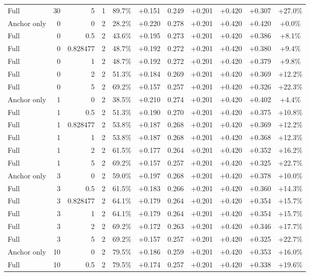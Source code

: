 \begin{table}[htbp]
\begin{tabular}{lrrrccccccc}
Full & 30 & 5 & 1 & 89.7\% & +0.151 & 0.249 & +0.201 & +0.420 & +0.307 & +27.0\% \\
Anchor only & 0 & 0 & 2 & 28.2\% & +0.220 & 0.278 & +0.201 & +0.420 & +0.420 & +0.0\% \\
Full & 0 & 0.5 & 2 & 43.6\% & +0.195 & 0.273 & +0.201 & +0.420 & +0.386 & +8.1\% \\
Full & 0 & 0.828477 & 2 & 48.7\% & +0.192 & 0.272 & +0.201 & +0.420 & +0.380 & +9.4\% \\
Full & 0 & 1 & 2 & 48.7\% & +0.192 & 0.272 & +0.201 & +0.420 & +0.379 & +9.8\% \\
Full & 0 & 2 & 2 & 51.3\% & +0.184 & 0.269 & +0.201 & +0.420 & +0.369 & +12.2\% \\
Full & 0 & 5 & 2 & 69.2\% & +0.157 & 0.257 & +0.201 & +0.420 & +0.326 & +22.3\% \\
Anchor only & 1 & 0 & 2 & 38.5\% & +0.210 & 0.274 & +0.201 & +0.420 & +0.402 & +4.4\% \\
Full & 1 & 0.5 & 2 & 51.3\% & +0.190 & 0.270 & +0.201 & +0.420 & +0.375 & +10.8\% \\
Full & 1 & 0.828477 & 2 & 53.8\% & +0.187 & 0.268 & +0.201 & +0.420 & +0.369 & +12.2\% \\
Full & 1 & 1 & 2 & 53.8\% & +0.187 & 0.268 & +0.201 & +0.420 & +0.368 & +12.3\% \\
Full & 1 & 2 & 2 & 61.5\% & +0.177 & 0.264 & +0.201 & +0.420 & +0.352 & +16.2\% \\
Full & 1 & 5 & 2 & 69.2\% & +0.157 & 0.257 & +0.201 & +0.420 & +0.325 & +22.7\% \\
Anchor only & 3 & 0 & 2 & 59.0\% & +0.197 & 0.268 & +0.201 & +0.420 & +0.378 & +10.0\% \\
Full & 3 & 0.5 & 2 & 61.5\% & +0.183 & 0.266 & +0.201 & +0.420 & +0.360 & +14.3\% \\
Full & 3 & 0.828477 & 2 & 64.1\% & +0.179 & 0.264 & +0.201 & +0.420 & +0.354 & +15.7\% \\
Full & 3 & 1 & 2 & 64.1\% & +0.179 & 0.264 & +0.201 & +0.420 & +0.354 & +15.7\% \\
Full & 3 & 2 & 2 & 69.2\% & +0.172 & 0.263 & +0.201 & +0.420 & +0.346 & +17.7\% \\
Full & 3 & 5 & 2 & 69.2\% & +0.157 & 0.257 & +0.201 & +0.420 & +0.325 & +22.7\% \\
Anchor only & 10 & 0 & 2 & 79.5\% & +0.186 & 0.259 & +0.201 & +0.420 & +0.353 & +16.0\% \\
Full & 10 & 0.5 & 2 & 79.5\% & +0.174 & 0.257 & +0.201 & +0.420 & +0.338 & +19.6\% \\

\end{tabular}
\end{table}
